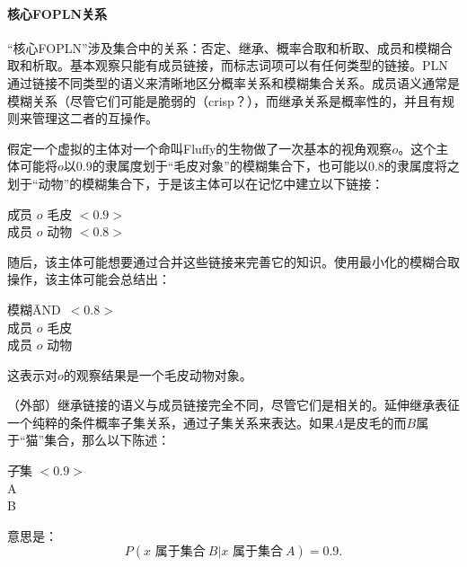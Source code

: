 \paragraph{核心FOPLN关系}

“核心FOPLN”涉及集合中的关系：否定、继承、概率合取和析取、成员和模糊合取和析取。基本观察只能有成员链接，而标志词项可以有任何类型的链接。PLN通过链接不同类型的语义来清晰地区分概率关系和模糊集合关系。成员语义通常是模糊关系（尽管它们可能是脆弱的（crisp？），而继承关系是概率性的，并且有规则来管理这二者的互操作。

假定一个虚拟的主体对一个命叫Fluffy的生物做了一次基本的视角观察$o$。这个主体可能将$o$以0.9的隶属度划于“毛皮对象”的模糊集合下，也可能以0.8的隶属度将之划于“动物”的模糊集合下，于是该主体可以在记忆中建立以下链接：

 \begin{tabbing}
\=成员 $o$ 毛皮 $< 0.9 >$ \\
\>成员 $o$ 动物 $< 0.8 >$ \\
\end{tabbing}

随后，该主体可能想要通过合并这些链接来完善它的知识。使用最小化的模糊合取操作，该主体可能会总结出：

 \begin{tabbing}
模糊\=AND\ $<0.8>$\\
\> 成员 $o$ 毛皮 \\
\> 成员 $o$ 动物 \\
\end{tabbing}

这表示对$o$的观察结果是一个毛皮动物对象。

（外部）继承链接的语义与成员链接完全不同，尽管它们是相关的。延伸继承表征一个纯粹的条件概率子集关系，通过子集关系来表达。如果$A$是皮毛的而$B$属于“猫”集合，那么以下陈述：

\begin{tabbing}
\=子集 $<0.9>$\\
\>A\\
\>B\\
\end{tabbing}

意思是：$$P(x \mbox{ 属于集合}\ B\vert x \mbox{ 属于集合}\ A) = 0.9.$$ 
